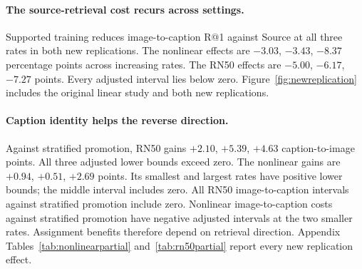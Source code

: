
\paragraph{The source-retrieval cost recurs across settings.}
Supported training reduces image-to-caption R@1 against Source at all three rates in both new replications.
The nonlinear effects are $-3.03$, $-3.43$, $-8.37$ percentage points across increasing rates.
The RN50 effects are $-5.00$, $-6.17$, $-7.27$ points.
Every adjusted interval lies below zero.
Figure~\ref{fig:newreplication} includes the original linear study and both new replications.
\paragraph{Caption identity helps the reverse direction.}
Against stratified promotion, RN50 gains $+2.10$, $+5.39$, $+4.63$ caption-to-image points.
All three adjusted lower bounds exceed zero.
The nonlinear gains are $+0.94$, $+0.51$, $+2.69$ points.
Its smallest and largest rates have positive lower bounds; the middle interval includes zero.
All RN50 image-to-caption intervals against stratified promotion include zero.
Nonlinear image-to-caption costs against stratified promotion have negative adjusted intervals at the two smaller rates.
Assignment benefits therefore depend on retrieval direction.
Appendix Tables~\ref{tab:nonlinearpartial} and~\ref{tab:rn50partial} report every new replication effect.
